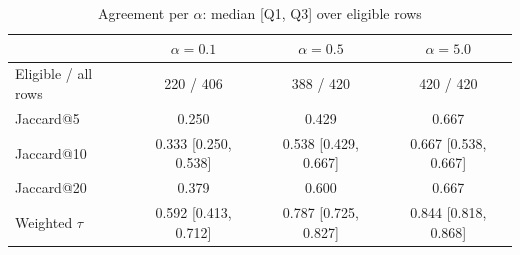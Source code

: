\begin{table}[t]
\centering
\caption{Agreement per $\alpha$: median [Q1, Q3] over eligible rows}
\label{tab:agree_alpha}
\footnotesize
\setlength{\tabcolsep}{3pt}
\begin{tabular}{@{}lccc@{}}
\toprule
 & $\alpha=0.1$ & $\alpha=0.5$ & $\alpha=5.0$\\ %
\midrule
Eligible / all rows & 220 / 406 & 388 / 420 & 420 / 420\\ %
Jaccard@5 & 0.250 & 0.429 & 0.667\\ %
Jaccard@10 & 0.333 [0.250, 0.538] & 0.538 [0.429, 0.667] & 0.667 [0.538, 0.667]\\ %
Jaccard@20 & 0.379 & 0.600 & 0.667\\ %
Weighted $\tau$ & 0.592 [0.413, 0.712] & 0.787 [0.725, 0.827] & 0.844 [0.818, 0.868]\\ %
\bottomrule
\end{tabular}
\end{table}

